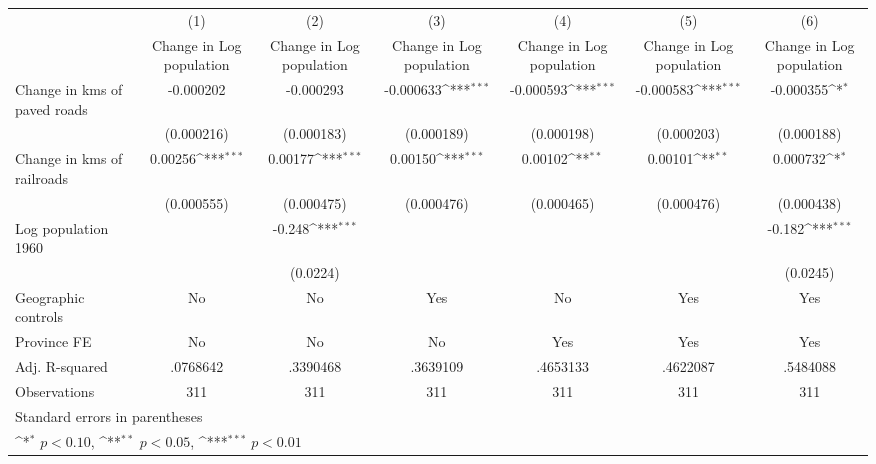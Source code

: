 {
\def\sym#1{\ifmmode^{#1}\else\(^{#1}\)\fi}
\begin{tabular}{l*{6}{c}}
\hline\hline
                    &\multicolumn{1}{c}{(1)}&\multicolumn{1}{c}{(2)}&\multicolumn{1}{c}{(3)}&\multicolumn{1}{c}{(4)}&\multicolumn{1}{c}{(5)}&\multicolumn{1}{c}{(6)}\\
                    &\multicolumn{1}{c}{Change in Log population}&\multicolumn{1}{c}{Change in Log population}&\multicolumn{1}{c}{Change in Log population}&\multicolumn{1}{c}{Change in Log population}&\multicolumn{1}{c}{Change in Log population}&\multicolumn{1}{c}{Change in Log population}\\
\hline
Change in kms of paved roads&   -0.000202         &   -0.000293         &   -0.000633\sym{***}&   -0.000593\sym{***}&   -0.000583\sym{***}&   -0.000355\sym{*}  \\
                    &  (0.000216)         &  (0.000183)         &  (0.000189)         &  (0.000198)         &  (0.000203)         &  (0.000188)         \\
[1em]
Change in kms of railroads&     0.00256\sym{***}&     0.00177\sym{***}&     0.00150\sym{***}&     0.00102\sym{**} &     0.00101\sym{**} &    0.000732\sym{*}  \\
                    &  (0.000555)         &  (0.000475)         &  (0.000476)         &  (0.000465)         &  (0.000476)         &  (0.000438)         \\
[1em]
Log population 1960 &                     &      -0.248\sym{***}&                     &                     &                     &      -0.182\sym{***}\\
                    &                     &    (0.0224)         &                     &                     &                     &    (0.0245)         \\
\hline
Geographic controls &          No         &          No         &         Yes         &          No         &         Yes         &         Yes         \\
Province FE         &          No         &          No         &          No         &         Yes         &         Yes         &         Yes         \\
Adj. R-squared      &    .0768642         &    .3390468         &    .3639109         &    .4653133         &    .4622087         &    .5484088         \\
Observations        &         311         &         311         &         311         &         311         &         311         &         311         \\
\hline\hline
\multicolumn{7}{l}{\footnotesize Standard errors in parentheses}\\
\multicolumn{7}{l}{\footnotesize \sym{*} \(p<0.10\), \sym{**} \(p<0.05\), \sym{***} \(p<0.01\)}\\
\end{tabular}
}
